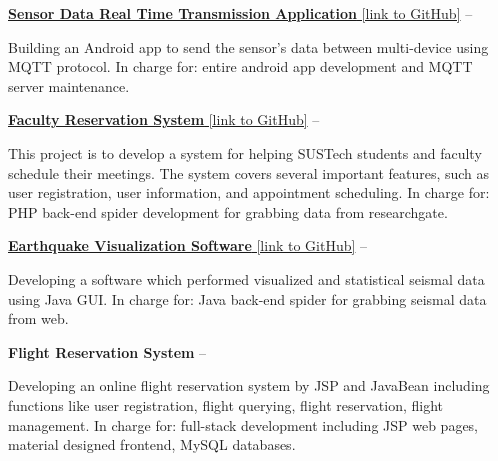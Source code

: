 \documentclass[a4paper,MMMyyyy,nonstopmode]{simpleresumecv}
\begin{document}
\begin{Body}
    \Gap

    \BulletItem
    \href{https://github.com/hackroid/MqttSensorDemo}{\textbf{Sensor Data Real Time Transmission Application} [link to GitHub]}
    \hfill
     --
    \begin{Detail}
        \SubBulletItem
        Building an Android app to send the sensor's data between multi-device using MQTT protocol.
        \SubBulletItem
        In charge for: entire android app development and MQTT server maintenance.
    \end{Detail}

    \Gap

    \BulletItem
    \href{https://github.com/zhaoweizhong/Faculty-Reservation}{\textbf{Faculty Reservation System} [link to GitHub]}
    \hfill
     --
    \begin{Detail}
        \SubBulletItem
        This project is to develop a system for helping SUSTech students and faculty schedule their meetings. The system covers several important features, such as user registration, user information, and appointment scheduling.
        \SubBulletItem
        In charge for: PHP back-end spider development for grabbing data from researchgate.
    \end{Detail}

    \Gap

    \BulletItem
    \href{https://github.com/hackroid/Mr.Earthquake}{\textbf{Earthquake Visualization Software} [link to GitHub]}
    \hfill
     --
    \begin{Detail}
        \SubBulletItem Developing a software which performed visualized and statistical seismal data using Java GUI.
        \SubBulletItem In charge for: Java back-end spider for grabbing seismal data from web.
    \end{Detail}

    \Gap

    \BulletItem
    \textbf{Flight Reservation System}
    \hfill
     --
    \begin{Detail}
        \SubBulletItem Developing an online flight reservation system by JSP and JavaBean including functions like user registration, flight querying, flight reservation, flight management.
        \SubBulletItem In charge for: full-stack development including JSP web pages, material designed frontend, MySQL databases.
    \end{Detail}


\end{Body}
\end{document}
